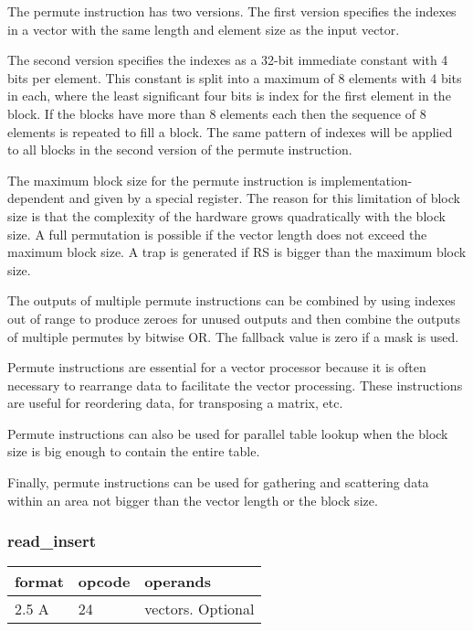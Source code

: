 \documentclass[forwardcom.tex]{subfiles}
\begin{document}
The permute instruction has two versions. The first version specifies the indexes in a vector with the same length and element size as the input vector.
\vspace{2mm}

The second version specifies the indexes as a 32-bit immediate constant with 4 bits per element. This constant is split into a maximum of 8 elements with 4 bits in each, where the least significant four bits is index for the first element in the block.
If the blocks have more than 8 elements each then the sequence of 8 elements is repeated to fill a block. The same pattern of indexes will be applied to all blocks in the second version of the permute instruction.
\vspace{2mm}

The maximum block size for the permute instruction is implementation-dependent and given by a special register. The reason for this limitation of block size is that the complexity of the hardware grows quadratically with the block size. A full permutation is possible if the vector length does not exceed the maximum block size. A trap is generated if RS is bigger than the maximum block size.
\vspace{2mm}

The outputs of multiple permute instructions can be combined by using indexes out of range to produce zeroes for unused outputs and then combine the outputs of multiple permutes by bitwise OR. 
The fallback value is zero if a mask is used.
\vspace{2mm}

Permute instructions are essential for a vector processor because it is often necessary to rearrange data to facilitate the vector processing. These instructions are useful for reordering data, for transposing a matrix, etc. 
\vspace{2mm}

Permute instructions can also be used for parallel table lookup when the block size is big enough to contain the entire table.
\vspace{2mm}

Finally, permute instructions can be used for gathering and scattering data within an area not bigger than the vector length or the block size.

\subsubsection{read\_insert}
\label{table:readInsertInstruction}
\begin{tabular}{|p{12mm}|p{12mm}|p{110mm}|}
\hline
\bfseries format & \bfseries opcode & \bfseries operands \\ \hline
2.5 A & 24 & vectors. Optional \\ \hline
\end{tabular}
\vspace{2mm}
\end{document}
